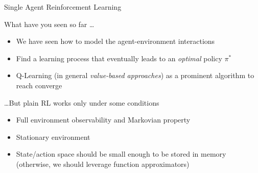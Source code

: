 \documentclass[presentation, 8pt]{beamer}\mode<presentation>{\usetheme{AMSBolognaFC}}
\begin{document}
\begin{frame}{Single Agent Reinforcement Learning}
	\begin{exampleblock}{What have you seen so far \dots}
		\begin{itemize}
			\item We have seen how to model the agent-environment interactions
			\item Find a learning process that eventually leads to an \emph{optimal} policy $\pi^*$
			\item Q-Learning (in general \emph{value-based approaches}) as a prominent algorithm to reach converge
		\end{itemize}
	\end{exampleblock}
	\begin{alertblock}{\dots But plain RL works only under some conditions}
		\begin{itemize}
			\item Full environment observability and Markovian property
			\item Stationary environment
			\item State/action space should be small enough to be stored in memory (otherwise, we should leverage function approximators)
		\end{itemize}	
	\end{alertblock}
\end{frame}
\end{document}
